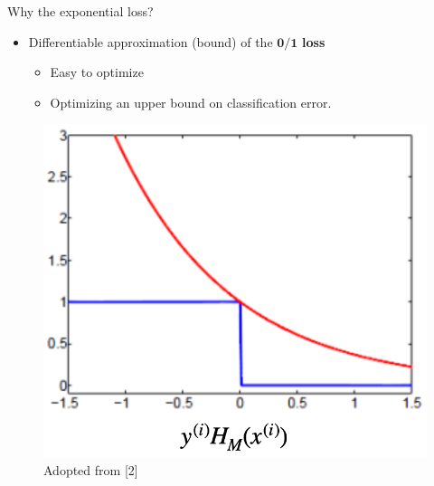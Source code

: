 \documentclass[serif, aspectratio=169]{beamer}
\begin{document}
\begin{frame}{Why the exponential loss?}
    \begin{itemize}
        \itemsep1em
        \justifying
        \item Differentiable approximation (bound) of the $\boldsymbol{0/1}$ \textbf{loss}
        \begin{itemize}
            \itemsep0.25em
            \item Easy to optimize
            \item Optimizing an upper bound on classification error.
        \end{itemize}
    \end{itemize}
    \endminipage
    \hfill
    \begin{figure}
        \includegraphics[width=\textwidth]{pic/exploss.png}
        {\scriptsize Adopted from [2]}
    \end{figure}
    \endminipage
\end{frame}

\end{document}
